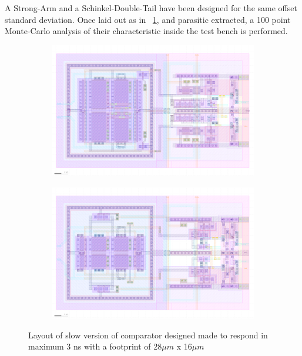 A Strong-Arm and a Schinkel-Double-Tail have been designed for the same offset standard deviation. Once laid out as in \figurename~\ref{fig:layout-comp}, and parasitic extracted, a 100 point Monte-Carlo analysis of their characteristic inside the test bench is performed. 

\begin{figure}[!htp]
    \centering
    \begin{subfigure}[b]{0.48\textwidth}
        \includegraphics[width=\textwidth]{Chapter7/Figs/layout-slow-dtl.png}
    \end{subfigure}
    \begin{subfigure}[b]{0.48\textwidth}
        \includegraphics[width=\textwidth]{Chapter7/Figs/layout-slow-sa.png}
    \end{subfigure}
    \caption{Layout of slow version of comparator designed made to respond in maximum 3 ns with a footprint of 28\(\mu m\) x 16\(\mu m\)}
    \label{fig:layout-comp}
\end{figure}

